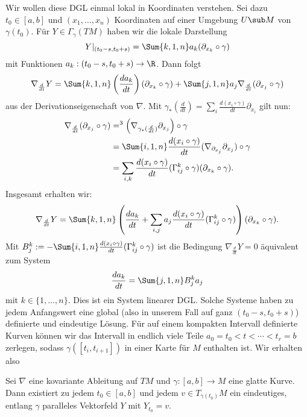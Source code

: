 Wir wollen diese DGL einmal lokal in Koordinaten verstehen. Sei dazu $t_0 \in [a,b]$ und $(x_1, \dots, x_n)$ Koordinaten auf einer Umgebung $U \sub M$ von $\gamma (t_0)$. Für $Y \in \Gamma_\gamma (TM)$ haben wir die lokale Darstellung 
\begin{equation}
Y|_{(t_0-s, t_0+s)} = \Sum{k,1,n} a_k (\partial_{x_k} \circ \gamma)
\end{equation}
mit Funktionen $a_k: (t_0-s, t_0+s) \to \R$. Dann folgt
\begin{equation}
\nabla_\frac{d}{dt} Y = \Sum{k,1,n} \left( \frac{da_k}{dt}\right) (\partial_{x_k} \circ \gamma) + \Sum{j,1,n} a_j \nabla_\frac{d}{dt} (\partial_{x_j} \circ \gamma)
\end{equation}
aus der Derivationseigenschaft von $\nabla$. Mit $\gamma_\ast (\frac{d}{dt}) = \sum_i \frac{d (x_i \circ \gamma)}{dt} \partial_{x_i}$ gilt nun: 
\begin{align}
\nabla_\frac{d}{dt} (\partial_{x_j} \circ \gamma) &=^3 \left( \nabla_{\gamma_\ast (\frac{d}{dt} )} \partial_{x_j}\right) \circ \gamma\\
&= \Sum{i,1,n} \frac{d (x_i \circ \gamma)}{dt} (\nabla_{\partial_{x_j}} \partial_{x_j} ) \circ \gamma \\
&= \sum_{i,k} \frac{d (x_i \circ \gamma)}{dt} (\Gamma_{ij}^k \circ \gamma)(\partial_{x_k} \circ \gamma).
\end{align}
Insgesamt erhalten wir:
\begin{equation}
\nabla_\frac{d}{dt}Y = \Sum{k,1,n} \left( \frac{d a_k}{dt} + \sum_{i,j} a_j \frac{d (x_i \circ \gamma)}{dt} (\Gamma_{ij}^k \circ \gamma)\right)(\partial_{x_k} \circ \gamma).
\end{equation}
Mit $B_j^k := - \Sum{i,1,n} \frac{d (x_i \circ \gamma)}{dt} (\Gamma_{ij}^k \circ \gamma)$ ist die Bedingung $\nabla_\frac{d}{dt}  Y = 0$ äquivalent zum System
\begin{equation}
\frac{d a_k}{dt} = \Sum{j,1,n} B_j^k a_j
\end{equation}
mit $k \in \{1, \dots, n \}$. Dies ist ein System linearer DGL. Solche Systeme haben zu jedem Anfangswert eine global (also in unserem Fall auf ganz $(t_0 -s, t_0 +s)$) definierte und eindeutige Lösung. Für auf einem kompakten Intervall definierte Kurven können wir das Intervall in endlich viele Teile $a_0 = t_0 < t < \cdots < t_r =b$ zerlegen, sodass $\gamma([t_i, t_{i+1}])$ in einer Karte für $M$ enthalten ist. Wir erhalten also
\begin{satz}{}{}
Sei $\nabla$ eine kovariante Ableitung auf $TM$ und $\gamma: [a,b] \to M$ eine glatte Kurve. Dann existiert zu jedem $t_0 \in [a,b]$ und jedem $v \in T_{\gamma (t_0)} M$ ein eindeutiges, entlang $\gamma$ paralleles Vektorfeld $Y$ mit $Y_{t_0} = v$.
\end{satz}
